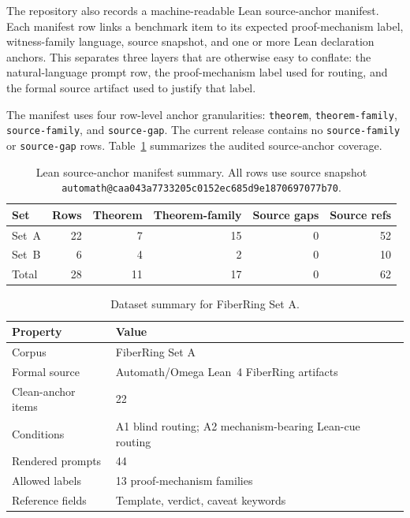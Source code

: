 \documentclass[11pt]{article}
\begin{document}
The repository also records a machine-readable Lean source-anchor manifest.
Each manifest row links a benchmark item to its expected proof-mechanism label,
witness-family language, source snapshot, and one or more Lean declaration
anchors. This separates three layers that are otherwise easy to conflate: the
natural-language prompt row, the proof-mechanism label used for routing, and
the formal source artifact used to justify that label.

The manifest uses four row-level anchor granularities:
\texttt{theorem}, \texttt{theorem-family}, \texttt{source-family}, and
\texttt{source-gap}. The current release contains no \texttt{source-family}
or \texttt{source-gap} rows. Table~\ref{tab:manifest-summary} summarizes the
audited source-anchor coverage.

\begin{table}[htbp]
\centering
\caption{Lean source-anchor manifest summary. All rows use source snapshot
         \texttt{automath@caa043a7733205c0152ec685d9e1870697077b70}.}
\label{tab:manifest-summary}
\begin{tabular}{lrrrrr}
\toprule
\textbf{Set} & \textbf{Rows} & \textbf{Theorem} & \textbf{Theorem-family}
  & \textbf{Source gaps} & \textbf{Source refs} \\
\midrule
Set~A & 22 & 7 & 15 & 0 & 52 \\
Set~B & 6  & 4 & 2  & 0 & 10 \\
\midrule
Total & 28 & 11 & 17 & 0 & 62 \\
\bottomrule
\end{tabular}
\end{table}

\begin{table}[t]
\centering
\begin{tabular}{ll}
\toprule
Property & Value \\
\midrule
Corpus & FiberRing Set A \\
Formal source & Automath/Omega Lean~4 FiberRing artifacts \\
Clean-anchor items & 22 \\
Conditions & A1 blind routing; A2 mechanism-bearing Lean-cue routing \\
Rendered prompts & 44 \\
Allowed labels & 13 proof-mechanism families \\
Reference fields & Template, verdict, caveat keywords \\
\bottomrule
\end{tabular}
\caption{Dataset summary for FiberRing Set A.}
\label{tab:dataset-summary}
\end{table}
\end{document}
